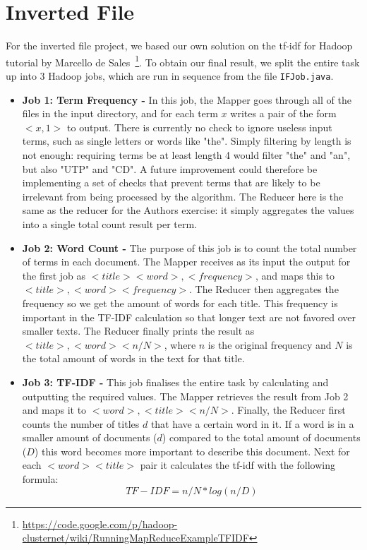\documentclass[11pt]{article}
\begin{document}
\section{Inverted File}
For the inverted file project, we based our own solution on the tf-idf for Hadoop tutorial by Marcello de Sales~\footnote{\url{https://code.google.com/p/hadoop-clusternet/wiki/RunningMapReduceExampleTFIDF}}. To obtain our final result, we split the entire task up into 3 Hadoop jobs, which are run in sequence from the file \lstinline{IFJob.java}.

\begin{itemize}

\item \textbf{Job 1: Term Frequency -} In this job, the Mapper goes through all of the files in the input directory, and for each term $x$ writes a pair of the form $<x, 1>$ to output. There is currently no check to ignore useless input terms, such as single letters or words like "the". Simply filtering by length is not enough: requiring terms be at least length 4 would filter "the" and "an", but also "UTP" and "CD". A future improvement could therefore be implementing a set of checks that prevent terms that are likely to be irrelevant from being processed by the algorithm.
The Reducer here is the same as the reducer for the Authors exercise: it simply aggregates the values into a single total count result per term.
\item \textbf{Job 2: Word Count -} The purpose of this job is to count the total number of terms in each document. The Mapper receives as its input the output for the first job as $<title><word>,<frequency>$, and maps this to $<title>, <word><frequency>$. The Reducer then aggregates the frequency so we get the amount of words for each title. This frequency is important in the TF-IDF calculation so that longer text are not favored over smaller texts. The Reducer finally prints the result as $<title>, <word><n/N>$, where $n$ is the original frequency and $N$ is the total amount of words in the text for that title.
\item \textbf{Job 3: TF-IDF -} This job finalises the entire task by calculating and outputting the required values. The Mapper retrieves the result from Job 2 and maps it to $<word>, <title><n/N>$. Finally, the Reducer first counts the number of titles $d$ that have a certain word in it. If a word is in a smaller amount of documents ($d$) compared to the total amount of documents ($D$) this word becomes more important to describe this document. Next for each $<word><title>$ pair it calculates the tf-idf with the following formula: $$TF-IDF = n/N * log(n/D)$$
\end{itemize}
\end{document}
